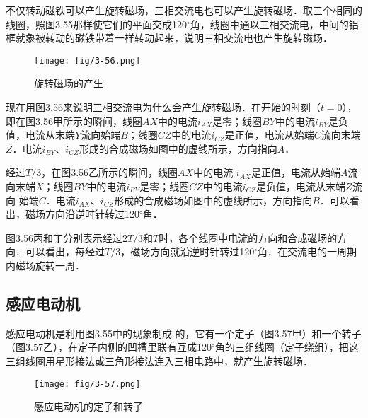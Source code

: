 不仅转动磁铁可以产生旋转磁场，三相交流电也可以产生旋转磁场．取三个相同的线圈，照图3.55那样使它们的平面交成120$^\circ$角，线圈中通以三相交流电，中间的铝框就象被转动的磁铁带着一样转动起来，说明三相交流电也产生旋转磁场．
\begin{figure}[htp]\centering
{}
\texttt{[image: fig/3-56.png]}
\caption{旋转磁场的产生}
\end{figure}

现在用图3.56来说明三相交流电为什么会产生旋转磁场．在开始的时刻（$t=0$），即在图3.56甲所示的瞬间，线圈$AX$中的电流$i_{AX}$是零；线圈$BY$中的电流$i_{BY}$是负值，电流从末端$Y$流向始端$B$；线圈$CZ$中的电流$i_{CZ}$是正值，电流从始端$C$流向末端$Z$．电流$i_{BY}$、$i_{CZ}$形成的合成磁场如图中的虚线所示，方向指向$A$．

经过$T/3$，在图3.56乙所示的瞬间，线圈$AX$中的电流
$i_{AX}$是正值，电流从始端$A$流向末端$X$；线圈$BY$中的电流$i_{BY}$是零；线圈$CZ$中的电流$i_{CZ}$是负值，电流从末端$Z$流向
始端$C$．电流$i_{AX}$、$i_{CZ}$形成的合成磁场如图中的虚线所示，方向指向$B$．可以看出，磁场方向沿逆时针转过120$^\circ$角．

图3.56丙和丁分别表示经过$2T/3$和$T$时，各个线圈中电流的方向和合成磁场的方向．可以看出，每经过$T/3$，磁场方向就沿逆时针转过120$^\circ$角．在交流电的一周期内磁场旋转一周．

\subsection{感应电动机}

感应电动机是利用图3.55中的现象制成
的，它有一个定子（图3.57甲）和一个转子（图3.57乙），在定子内侧的凹槽里联有互成120$^\circ$角的三组线圈（定子绕组），把这三组线圈用星形接法或三角形接法连入三相电路中，就产生旋转磁场．
\begin{figure}[htp]\centering
\texttt{[image: fig/3-57.png]}
\caption{感应电动机的定子和转子}
\end{figure}

